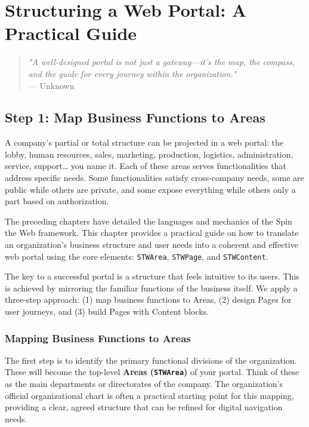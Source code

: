 \chapter{Structuring a Web Portal: A Practical Guide}
\label{chap:portal-structure}

\begin{quote}
\textit{"A well-designed portal is not just a gateway---it's the map, the compass, and the guide for every journey within the organization."} \\
— Unknown
\end{quote}

\section{Step 1: Map Business Functions to Areas}
\label{sec:step1-areas}

A company's partial or total structure can be projected in a web portal: the lobby, human resources, sales, marketing, production, logistics, administration, service, support… you name it. Each of these areas serves functionalities that address specific needs. Some functionalities satisfy cross-company needs, some are public while others are private, and some expose everything while others only a part based on authorization.

The preceding chapters have detailed the languages and mechanics of the Spin the Web framework. This chapter provides a practical guide on how to translate an organization's business structure and user needs into a coherent and effective web portal using the core \wbdl{} elements: \texttt{STWArea}, \texttt{STWPage}, and \texttt{STWContent}.

The key to a successful portal is a structure that feels intuitive to its users. This is achieved by mirroring the familiar functions of the business itself. We apply a three-step approach: (1) map business functions to Areas, (2) design Pages for user journeys, and (3) build Pages with Content blocks.

\subsection{Mapping Business Functions to Areas}
The first step is to identify the primary functional divisions of the organization. These will become the top-level \textbf{Areas (\texttt{STWArea})} of your portal. Think of these as the main departments or directorates of the company. The organization's official organizational chart is often a practical starting point for this mapping, providing a clear, agreed structure that can be refined for digital navigation needs.

